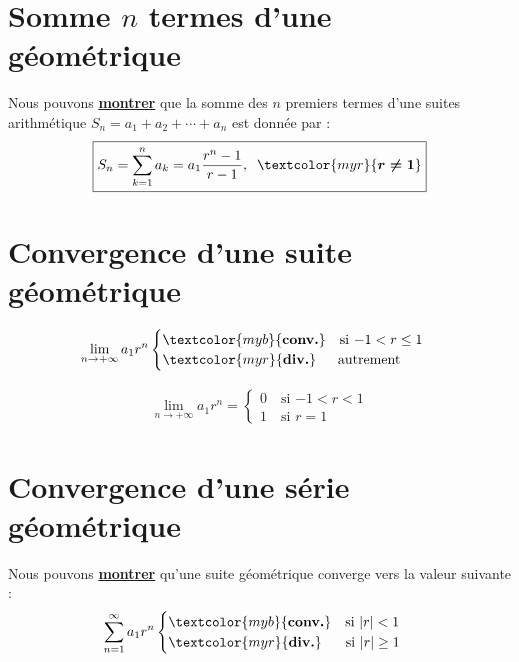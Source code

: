 \documentclass{report}
\begin{document}
\begin{multicols*}{3}
        \section{Somme $n$ termes d'une géométrique}
        Nous pouvons \hyperlink{Somme des n premiers termes géométrique}{\textbf{montrer}}
        que la somme des $n$ premiers termes d'une suites arithmétique
            $S_n = a_1 + a_2 + \cdots + a_n$ est donnée par :
    \[%
        \boxed{S_n = \sum_{k=1}^{n }a_k = a_1\dfrac{r^{n} - 1}{r - 1}, 
            \;\; \textcolor{myr}{\boldsymbol{r \neq 1}}}    
        \]%

        \section{Convergence d'une suite géométrique}
        \vspace{-1em}
        \noindent       
        \begin{align*}
            \lim\limits_{n\to+\infty }a_1r^n  
                    \begin{cases}
                        \textcolor{myb}{\textbf{conv.}}  \quad \text{si $-1 < r \leq 1$} \\
                        \textcolor{myr}{\textbf{div.}}  \quad\;\; \text{autrement}
                    \end{cases}
        \end{align*}


        \begin{align*}
            \boxed{
            \lim\limits_{n\to+\infty }a_1r^n = 
                    \begin{cases}
                        0 \quad \text{si $-1 < r < 1$} \\
                        1 \quad \text{si $r = 1$}
                \end{cases}}
        \end{align*}


    \section{Convergence d'une série géométrique}
        Nous pouvons \hyperlink{Convergence série géométrique}{\textbf{montrer}}
        qu'une suite géométrique converge vers la valeur suivante :
        \begin{align*}
                \sum_{n=1}^{\infty }a_1r^n  
                    \begin{cases}
                    \textcolor{myb}{\textbf{conv.}}  \quad \text{si $|r| < 1$} \\
                    \textcolor{myr}{\textbf{div.}}  \quad\;\;\, \text{si $|r| \geq 1$}
                \end{cases}
        \end{align*}


\end{multicols*}
\end{document}
